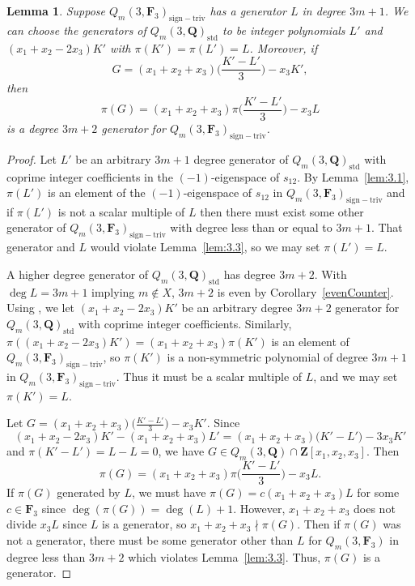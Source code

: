 \documentclass[pdftex]{sigma}
\newtheorem{Lemma}[Theorem]{Lemma}
\theoremstyle{definition}
\numberwithin{equation}{section}
\newcommand{\std}{\mathrm{std}}
\newcommand{\siv}{\mathrm{sign-triv}}
\begin{document}
\begin{Lemma}\label{3m+2}
 Suppose $Q_m(3,\mathbf{F}_3)_{\siv}$ has a generator $L$ in degree $3m+1$. We can choose the generators of $Q_m(3,\mathbf{Q})_{\std}$ to be integer polynomials $L'$ and $(x_1+x_2-2x_3)K'$ with $\pi(K')=\pi(L')=L$. Moreover, if
 \[G=(x_1+x_2+x_3)\biggl(\frac{K'-L'}{3}\biggr)-x_3K',\]
 then
 \[\pi(G)= (x_1+x_2+x_3)\pi\biggl(\frac{K'-L'}{3}\biggr)-x_3L\]
 is a degree $3m+2$ generator for $Q_m(3,\mathbf{F}_3)_{\siv}$.
\end{Lemma}
\begin{proof}
 Let $L'$ be an arbitrary $3m+1$ degree generator of $Q_m(3,\mathbf{Q})_{\std}$ with coprime integer coefficients in the $(-1)$-eigenspace of $s_{12}$. By Lemma~\ref{lem:3.1}, $\pi(L')$ is an element of the $(-1)$-eigenspace of $s_{12}$ in $Q_m(3,\mathbf{F}_3)_{\siv}$ and if $\pi(L')$ is not a scalar multiple of $L$ then there must exist some other generator of $Q_m(3,\mathbf{F}_3)_{\siv}$ with degree less than or equal to $3m+1$. That generator and $L$ would violate Lemma~\ref{lem:3.3}, so we may set $\pi(L')=L$.

 A higher degree generator of $Q_m(3,\mathbf{Q})_{\std}$ has degree $3m+2$. With $\deg L=3m+1$ implying $m\not\in X$, $3m+2$ is even by Corollary~\ref{evenCounter}. Using \cite{wang2022explicit}, we let $(x_1+x_2-2x_3)K'$ be an arbitrary degree $3m+2$ generator for $Q_m(3,\mathbf{Q})_{\std}$ with coprime integer coefficients. Similarly, $\pi((x_1+x_2-2x_3)K')= (x_1+x_2+x_3)\pi(K')$ is an element of $Q_m(3,\mathbf{F}_3)_{\siv}$, so $\pi(K')$ is a non-symmetric polynomial of degree $3m+1$ in $Q_m(3,\mathbf{F}_3)_\siv$. Thus it must be a scalar multiple of $L$, and we may set $\pi(K')=L$.

 Let $G=(x_1+x_2+x_3)\big(\frac{K'-L'}{3}\big)-x_3K'$. Since
 \[(x_1+x_2-2x_3)K'-(x_1+x_2+x_3)L' = (x_1+x_2+x_3)\big(K'-L'\big)-3x_3K'\]
 and $\pi(K'-L')=L-L=0$, we have $G\in Q_m(3,\mathbf{Q})\cap \mathbf{Z}[x_1,x_2,x_3]$. Then
 \[\pi(G)= (x_1+x_2+x_3)\pi\biggl(\frac{K'-L'}{3}\biggr)-x_3L.\]
 If $\pi(G)$ generated by $L$, we must have $\pi(G)=c(x_1+x_2+x_3)L$ for some $c\in \mathbf{F}_3$ since $\deg\left(\pi(G)\right)=\deg(L)+1$. However, $x_1+x_2+x_3$ does not divide $x_3L$ since $L$ is a generator, so $x_1+x_2+x_3\nmid \pi(G)$. Then if $\pi(G)$ was not a generator, there must be some generator other than $L$ for $Q_m(3,\mathbf{F}_3)$ in degree less than $3m+2$ which violates Lemma~\ref{lem:3.3}. Thus, $\pi(G)$ is a generator.
\end{proof}
\end{document}
